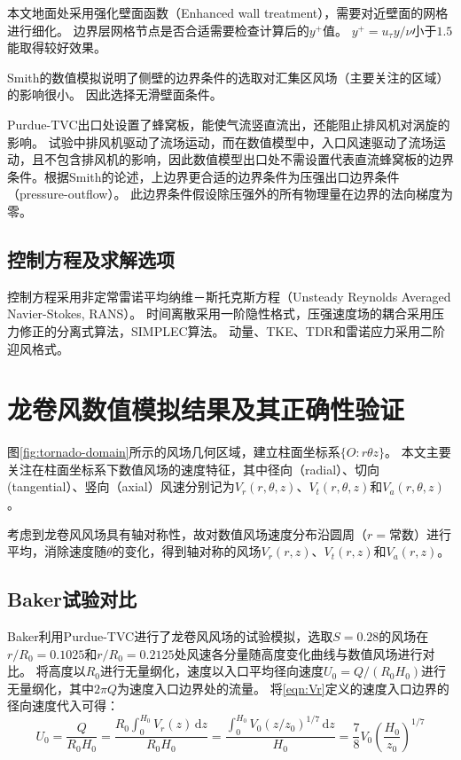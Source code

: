 本文地面处采用强化壁面函数（Enhanced wall treatment\cite{fluent2015user}），需要对近壁面的网格进行细化。
边界层网格节点是否合适需要检查计算后的$y^{+}$值。
$y^{+}=u_{\tau} y/\nu$小于$1.5$能取得较好效果。

Smith的数值模拟\cite{smith1987effect}说明了侧壁的边界条件的选取对汇集区风场（主要关注的区域）的影响很小。
因此选择无滑壁面条件。

Purdue-TVC出口处设置了蜂窝板，能使气流竖直流出，还能阻止排风机对涡旋的影响。
试验中排风机驱动了流场运动，而在数值模型中，入口风速驱动了流场运动，且不包含排风机的影响，因此数值模型出口处不需设置代表直流蜂窝板的边界条件。根据Smith\cite{smith1987effect}的论述，上边界更合适的边界条件为压强出口边界条件（pressure-outflow）。
此边界条件假设除压强外的所有物理量在边界的法向梯度为零\cite{fluent2015user}。

\subsection{控制方程及求解选项}
控制方程采用非定常雷诺平均纳维－斯托克斯方程（Unsteady Reynolds Averaged Navier-Stokes, RANS）。
时间离散采用一阶隐性格式，压强速度场的耦合采用压力修正的分离式算法，SIMPLEC算法。
动量、TKE、TDR和雷诺应力采用二阶迎风格式。

\section{龙卷风数值模拟结果及其正确性验证}\label{sec:tornado}
图\ref{fig:tornado-domain}所示的风场几何区域，建立柱面坐标系$\{O:r \theta z\}$。
本文主要关注在柱面坐标系下数值风场的速度特征，其中径向（radial）、切向(tangential）、竖向（axial）风速分别记为$V_r(r,\theta,z)$、$V_t(r,\theta,z)$和$V_a(r,\theta,z)$。

考虑到龙卷风风场具有轴对称性，故对数值风场速度分布沿圆周（$r=$常数）进行平均，消除速度随$\theta$的变化，得到轴对称的风场$V_r(r,z)$、$V_t(r,z)$和$V_a(r,z)$。


\subsection{Baker试验对比}
Baker利用Purdue-TVC进行了龙卷风风场的试验模拟\cite{baker1981boundary}，选取$S=0.28$的风场在$r/R_0=0.1025$和$r/R_0=0.2125$处风速各分量随高度变化曲线与数值风场进行对比。
将高度以$R_0$进行无量纲化，速度以入口平均径向速度$U_0=Q/(R_0 H_0)$进行无量纲化，其中$2\pi Q$为速度入口边界处的流量。
将\eqref{eqn:Vr}定义的速度入口边界的径向速度代入可得：
\begin{equation}
	U_0 = \frac{Q}{R_0 H_0} = \frac{R_0 \int_0^{H_0} V_r(z)\,\mathrm{d}z}{R_0 H_0} = \frac{\int_0^{H_0} V_0 (z/z_0)^{1/7}\,\mathrm{d}z}{H_0} = \frac{7}{8} V_0 \left(\frac{H_0}{z_0}\right)^{1/7}
\end{equation}

